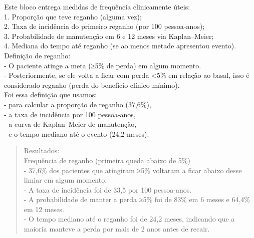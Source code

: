 \documentclass[
]{article}
\begin{document}
Este bloco entrega medidas de frequência clinicamente úteis:\\
1. Proporção que teve reganho (alguma vez);\\
2. Taxa de incidência do primeiro reganho (por 100 pessoa‑anos);\\
3. Probabilidade de manutenção em 6 e 12 meses via Kaplan--Meier;\\
4. Mediana do tempo até reganho (se ao menos metade apresentou
evento).\\

Definição de reganho:\\
- O paciente atinge a meta (≥5\% de perda) em algum momento.\\
- Posteriormente, se ele volta a ficar com perda \textless5\% em relação
ao basal, isso é considerado reganho (perda do benefício clínico
mínimo).\\

Foi essa definição que usamos:\\
- para calcular a proporção de reganho (37,6\%),\\
- a taxa de incidência por 100 pessoa-anos,\\
- a curva de Kaplan--Meier de manutenção,\\
- e o tempo mediano até o evento (24,2 meses).\\

\begin{quote}
Resultados:\\
Frequência de reganho (primeira queda abaixo de 5\%)\\
- 37,6\% dos pacientes que atingiram ≥5\% voltaram a ficar abaixo desse
limiar em algum momento.\\
- A taxa de incidência foi de 33,5 por 100 pessoa-anos.\\
- A probabilidade de manter a perda ≥5\% foi de 83\% em 6 meses e 64,4\%
em 12 meses.\\
- O tempo mediano até o reganho foi de 24,2 meses, indicando que a
maioria manteve a perda por mais de 2 anos antes de recair.\\
\end{quote}
\end{document}
